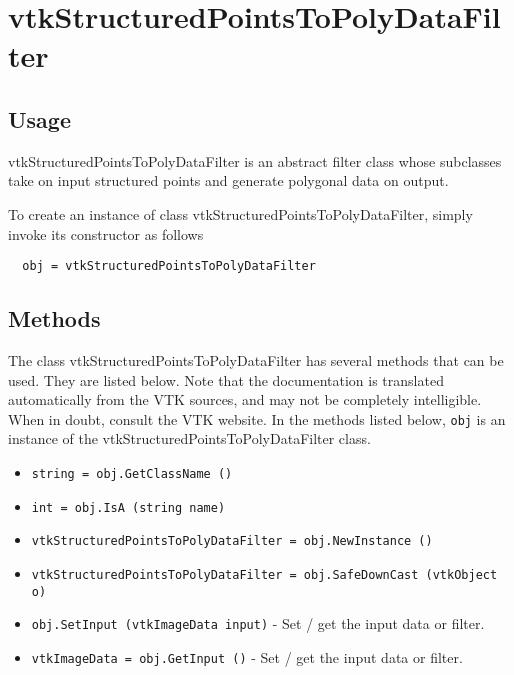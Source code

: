 \section{vtkStructuredPointsToPolyDataFilter}

\subsection{Usage}

 vtkStructuredPointsToPolyDataFilter is an abstract filter class whose
 subclasses take on input structured points and generate polygonal 
 data on output.

To create an instance of class vtkStructuredPointsToPolyDataFilter, simply
invoke its constructor as follows
\begin{verbatim}
  obj = vtkStructuredPointsToPolyDataFilter
\end{verbatim}
\subsection{Methods}

The class vtkStructuredPointsToPolyDataFilter has several methods that can be used.
  They are listed below.
Note that the documentation is translated automatically from the VTK sources,
and may not be completely intelligible.  When in doubt, consult the VTK website.
In the methods listed below, \verb|obj| is an instance of the vtkStructuredPointsToPolyDataFilter class.
\begin{itemize}
\item  \verb|string = obj.GetClassName ()|

\item  \verb|int = obj.IsA (string name)|

\item  \verb|vtkStructuredPointsToPolyDataFilter = obj.NewInstance ()|

\item  \verb|vtkStructuredPointsToPolyDataFilter = obj.SafeDownCast (vtkObject o)|

\item  \verb|obj.SetInput (vtkImageData input)| -  Set / get the input data or filter.

\item  \verb|vtkImageData = obj.GetInput ()| -  Set / get the input data or filter.

\end{itemize}
